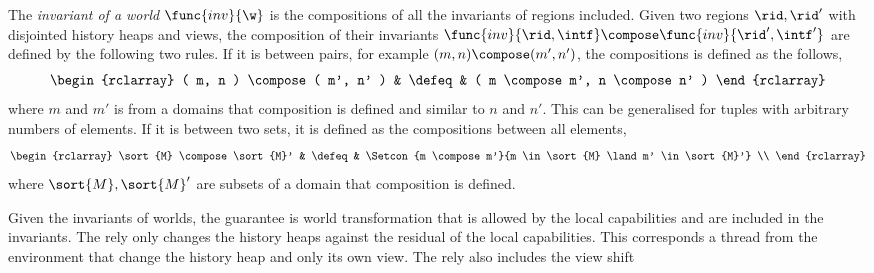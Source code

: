 \begin{defn}
The \emph{invariant of a world} \( \func{inv}{\w}\) is the compositions of all the invariants of regions included.
Given two regions \( \rid, \rid' \) with disjointed history heaps and views, the composition of their invariants \( \func{inv}{\rid,\intf} \compose \func{inv}{\rid', \intf'} \) are defined by the following two rules.
If it is between pairs, for example \( ( m, n ) \compose ( m', n' ) \), the compositions is defined as the follows,
\[
\begin{rclarray}
    ( m, n ) \compose ( m', n' ) & \defeq & ( m \compose  m',  n  \compose n' )
\end{rclarray}
\]
where \( m\) and \( m' \) is from a domains that composition is defined and similar to \( n\) and \( n' \).
This can be generalised for tuples with arbitrary numbers of elements.
If it is between two sets, it is defined as the compositions between all elements,
\[
\begin{rclarray}
\sort{M} \compose \sort{M}' & \defeq & \Setcon{m \compose m'}{m \in \sort{M} \land m' \in \sort{M}'} \\
\end{rclarray}
\]
where \( \sort{M}, \sort{M}'\) are subsets of a domain that composition is defined.
\end{defn}

Given the invariants of worlds, the guarantee is world transformation that is allowed by the local capabilities and are included in the invariants.
The rely only changes the history heaps against the residual of the local capabilities.
This corresponds a thread from the environment that change the history heap and only its own view.
The rely also includes the view shift

